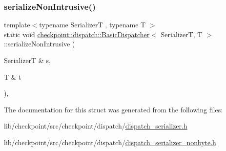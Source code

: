 \mbox{\label{structcheckpoint_1_1dispatch_1_1_basic_dispatcher_a795cda635c3b27b205a861cbba9d5384}} 
\subsubsection{\texorpdfstring{serialize\+Non\+Intrusive()}{serializeNonIntrusive()}}
{\footnotesize\ttfamily template$<$typename SerializerT , typename T $>$ \\
static void \hyperlink{structcheckpoint_1_1dispatch_1_1_basic_dispatcher}{checkpoint\+::dispatch\+::\+Basic\+Dispatcher}$<$ SerializerT, T $>$\+::serialize\+Non\+Intrusive (\begin{DoxyParamCaption}\item[{SerializerT \&}]{s,  }\item[{T \&}]{t }\end{DoxyParamCaption})\hspace{0.3cm}{\ttfamily [inline]}, {\ttfamily [static]}}



The documentation for this struct was generated from the following files\+:\begin{DoxyCompactItemize}
\item 
lib/checkpoint/src/checkpoint/dispatch/\hyperlink{dispatch__serializer_8h}{dispatch\+\_\+serializer.\+h}\item 
lib/checkpoint/src/checkpoint/dispatch/\hyperlink{dispatch__serializer__nonbyte_8h}{dispatch\+\_\+serializer\+\_\+nonbyte.\+h}\end{DoxyCompactItemize}
